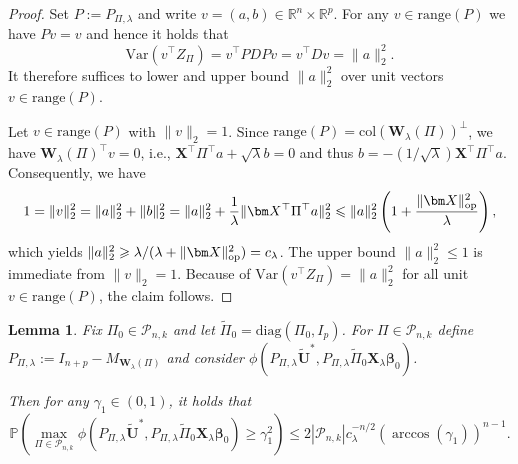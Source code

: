 \documentclass[11pt, reqno]{amsart}
\newcommand{\R}{\mathbb{R}}
\newcommand{\bP}{\mathbb{P}}
\renewcommand{\tilde}{\widetilde}
\renewcommand{\le}{\leqslant}
\renewcommand{\ge}{\geqslant}
\newcommand{\mP}{\mathcal{P}}
\newcommand{\1}{\mbox{1}\hspace{-0.25em}\mbox{l}}
\theoremstyle{definition}\newtheorem{problem}{Problem}[section]
\theoremstyle{definition}\newtheorem{definition}[problem]{Definition}
\theoremstyle{remark}\newtheorem{assumption}{Assumption}
\theoremstyle{remark}\newtheorem{remark}[problem]{Remark}
\theoremstyle{definition}\newtheorem{example}[problem]{Example}
\theoremstyle{plain}\newtheorem{theorem}[problem]{Theorem}
\theoremstyle{plain}\newtheorem{question}[problem]{Question}
\theoremstyle{plain}\newtheorem{lemma}[problem]{Lemma}
\theoremstyle{plain}\newtheorem{proposition}[problem]{Proposition}
\theoremstyle{plain}\newtheorem{corollary}[problem]{Corollary}
\theoremstyle{plain}\newtheorem{conjecture}[problem]{Conjecture}
\begin{document}
\begin{proof}
Set $P:=P_{\Pi,\lambda}$ and write $v=(a,b)\in\R^{n}\times\R^{p}$.
For any $v\in\mathrm{range}(P)$ we have $Pv=v$ and hence it holds that
\[
\mathrm{Var}(v^\top Z_\Pi)=v^\top P D P v = v^\top D v=\|a\|_2^2.
\]
It therefore suffices to lower and upper bound $\|a\|_2^2$ over unit vectors $v\in\mathrm{range}(P)$.

Let $v\in\mathrm{range}(P)$ with $\|v\|_2=1$.
Since $\mathrm{range}(P)=\mathrm{col}(\bm W_\lambda(\Pi))^\perp$, we have $\bm W_\lambda(\Pi)^\top v=0$, i.e.,
$\bm X^\top\Pi^\top a+\sqrt{\lambda}b=0$ and thus $b=-(1/\sqrt{\lambda})\bm X^\top\Pi^\top a$.
Consequently, we have
\[
1=\|v\|_2^2=\|a\|_2^2+\|b\|_2^2
=\|a\|_2^2+\frac{1}{\lambda}\|\bm X^\top\Pi^\top a\|_2^2
\le \|a\|_2^2\left(1+\frac{\|\bm X\|_{\rm op}^2}{\lambda}\right),
\]
which yields $\|a\|_2^2\ge \lambda/(\lambda+\|\bm X\|_{\rm op}^2)=c_\lambda$.
The upper bound $\|a\|_2^2\le 1$ is immediate from $\|v\|_2=1$.
Because of $\mathrm{Var}(v^\top Z_\Pi)=\|a\|_2^2$ for all unit $v\in\mathrm{range}(P)$, the claim follows.
\end{proof}

\begin{lemma}\label{lem:max_sim_ridge}
Fix $\Pi_0\in\mP_{n,k}$ and let $\tilde\Pi_0=\mathrm{diag}(\Pi_0,I_p)$.
For $\Pi\in\mP_{n,k}$ define $P_{\Pi,\lambda}:=I_{n+p}-M_{\bm W_\lambda(\Pi)}$ and consider $
\phi\left(P_{\Pi,\lambda}\tilde{\bm U}^*,P_{\Pi,\lambda}\tilde\Pi_0\bm X_\lambda\bm\beta_0\right)$.

Then for any $\gamma_1\in(0,1)$, it holds that
\[
\bP\left(
\max_{\Pi\in\mP_{n,k}}
\phi\left(P_{\Pi,\lambda}\tilde{\bm U}^*,P_{\Pi,\lambda}\tilde\Pi_0\bm X_\lambda\bm\beta_0\right)
\ge \gamma_1^2
\right)
\le
2|\mP_{n,k}|c_\lambda^{-n/2}\left(\arccos(\gamma_1)\right)^{n-1}.
\]
\end{lemma}
\end{document}
